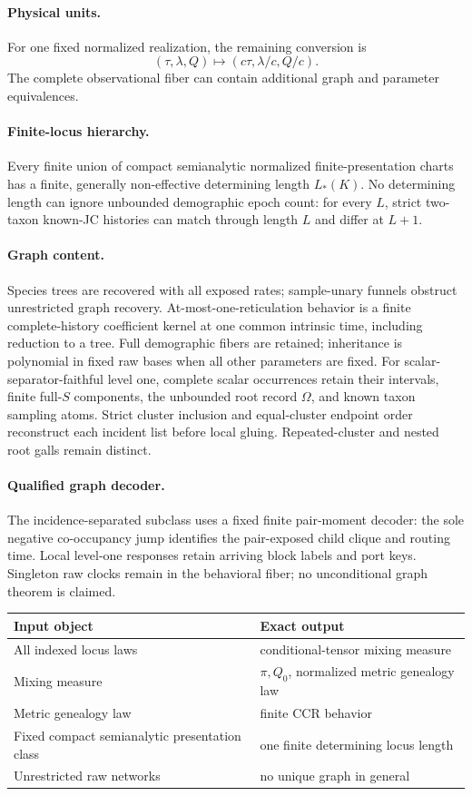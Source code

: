 \documentclass[10pt]{article}
\begin{document}
\paragraph{Physical units.}
For one fixed normalized realization, the remaining conversion is
\[
(\tau,\lambda,Q)\mapsto(c\tau,\lambda/c,Q/c).
\]
The complete observational fiber can contain additional graph and parameter equivalences.

\paragraph{Finite-locus hierarchy.}
Every finite union of compact semianalytic normalized finite-presentation charts has a finite, generally non-effective determining length $L_*(K)$. No determining length can ignore unbounded demographic epoch count: for every $L$, strict two-taxon known-JC histories can match through length $L$ and differ at $L+1$.

\paragraph{Graph content.}
Species trees are recovered with all exposed rates; sample-unary funnels obstruct unrestricted graph recovery. At-most-one-reticulation behavior is a finite complete-history coefficient kernel at one common intrinsic time, including reduction to a tree. Full demographic fibers are retained; inheritance is polynomial in fixed raw bases when all other parameters are fixed. For scalar-separator-faithful level one, complete scalar occurrences retain their intervals, finite full-$S$ components, the unbounded root record $\Omega$, and known taxon sampling atoms. Strict cluster inclusion and equal-cluster endpoint order reconstruct each incident list before local gluing. Repeated-cluster and nested root galls remain distinct.

\paragraph{Qualified graph decoder.}
The incidence-separated subclass uses a fixed finite pair-moment decoder: the sole negative co-occupancy jump identifies the pair-exposed child clique and routing time. Local level-one responses retain arriving block labels and port keys. Singleton raw clocks remain in the behavioral fiber; no unconditional graph theorem is claimed.

\begin{center}
\begin{tabularx}{\textwidth}{@{}lX@{}}\toprule
Input object & Exact output \\\midrule
All indexed locus laws & conditional-tensor mixing measure \\
Mixing measure & $\pi,Q_0$, normalized metric genealogy law \\
Metric genealogy law & finite CCR behavior \\
Fixed compact semianalytic presentation class & one finite determining locus length \\
Unrestricted raw networks & no unique graph in general \\
\bottomrule\end{tabularx}
\end{center}
\end{document}
